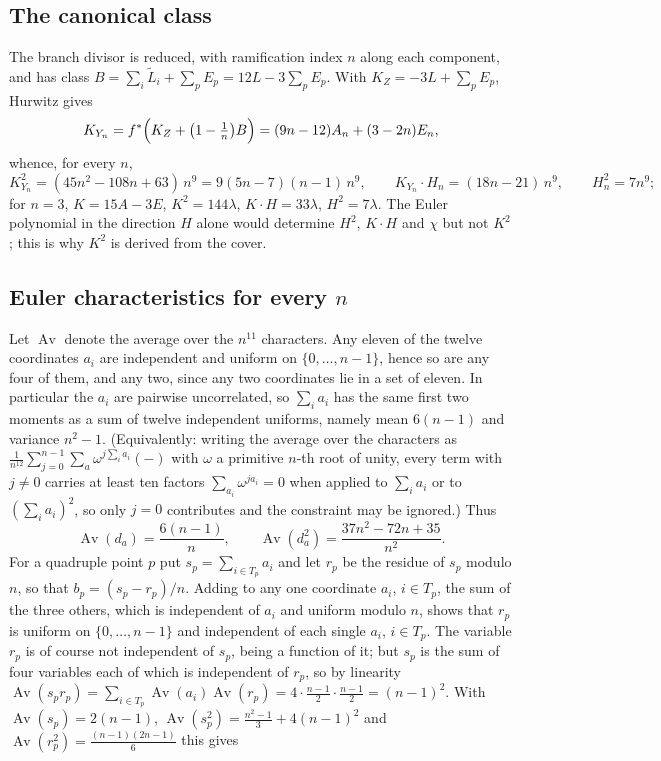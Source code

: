 \documentclass[11pt]{amsart}
\theoremstyle{remark}
\theoremstyle{definition}
\DeclareMathOperator{\Av}{Av}
\begin{document}
\subsection*{The canonical class}
The branch divisor is reduced, with ramification index $n$ along each component, and has class $B=\sum_i\tilde L_i+\sum_pE_p=12L-3\sum_pE_p$. With $K_Z=-3L+\sum_pE_p$, Hurwitz gives
\[
K_{Y_n}=f^*\Bigl(K_Z+\bigl(1-\tfrac1n\bigr)B\Bigr)=(9n-12)A_n+(3-2n)E_n ,
\]
whence, for every $n$,
\[
K_{Y_n}^2=(45n^2-108n+63)\,n^9=9(5n-7)(n-1)\,n^9,\qquad K_{Y_n}\cdot H_n=(18n-21)\,n^9,\qquad H_n^2=7n^9 ;
\]
for $n=3$, $K=15A-3E$, $K^2=144\lambda$, $K\cdot H=33\lambda$, $H^2=7\lambda$. The Euler polynomial in the direction $H$ alone would determine $H^2$, $K\cdot H$ and $\chi$ but not $K^2$; this is why $K^2$ is derived from the cover.

\subsection*{Euler characteristics for every \texorpdfstring{$n$}{n}}
Let $\Av$ denote the average over the $n^{11}$ characters. Any eleven of the twelve coordinates $a_i$ are independent and uniform on $\{0,\dots,n-1\}$, hence so are any four of them, and any two, since any two coordinates lie in a set of eleven. In particular the $a_i$ are pairwise uncorrelated, so $\sum_ia_i$ has the same first two moments as a sum of twelve independent uniforms, namely mean $6(n-1)$ and variance $n^2-1$. (Equivalently: writing the average over the characters as $\frac1{n^{12}}\sum_{j=0}^{n-1}\sum_a\omega^{j\sum_ia_i}(-)$ with $\omega$ a primitive $n$-th root of unity, every term with $j\ne0$ carries at least ten factors $\sum_{a_i}\omega^{ja_i}=0$ when applied to $\sum_ia_i$ or to $(\sum_ia_i)^2$, so only $j=0$ contributes and the constraint may be ignored.) Thus
\[
\Av(d_a)=\frac{6(n-1)}n,\qquad \Av(d_a^2)=\frac{37n^2-72n+35}{n^2}.
\]
For a quadruple point $p$ put $s_p=\sum_{i\in T_p}a_i$ and let $r_p$ be the residue of $s_p$ modulo $n$, so that $b_p=(s_p-r_p)/n$. Adding to any one coordinate $a_i$, $i\in T_p$, the sum of the three others, which is independent of $a_i$ and uniform modulo $n$, shows that $r_p$ is uniform on $\{0,\dots,n-1\}$ and independent of each single $a_i$, $i\in T_p$. The variable $r_p$ is of course not independent of $s_p$, being a function of it; but $s_p$ is the sum of four variables each of which is independent of $r_p$, so by linearity $\Av(s_pr_p)=\sum_{i\in T_p}\Av(a_i)\Av(r_p)=4\cdot\tfrac{n-1}2\cdot\tfrac{n-1}2=(n-1)^2$. With $\Av(s_p)=2(n-1)$, $\Av(s_p^2)=\frac{n^2-1}3+4(n-1)^2$ and $\Av(r_p^2)=\frac{(n-1)(2n-1)}6$ this gives
\end{document}
